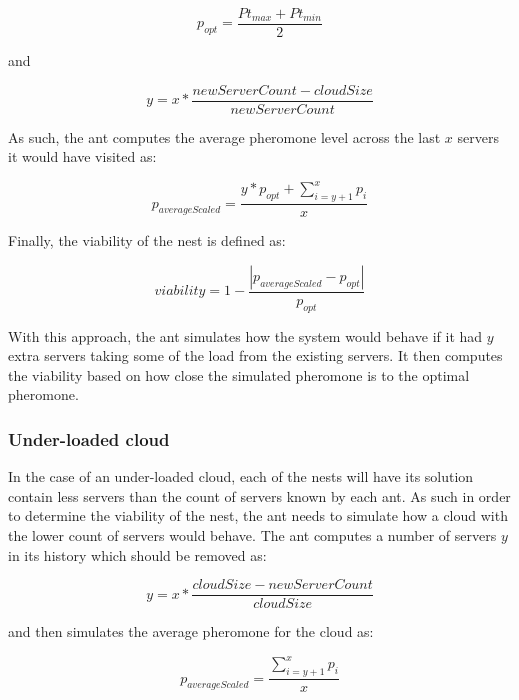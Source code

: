 \begin{equation}
	p_{opt} = \frac{Pt_{max} + Pt_{min}}{2}
\end{equation}

and 

\begin{equation}
	y = x * \frac{newServerCount - cloudSize}{newServerCount}
\end{equation}

As such, the ant computes the average pheromone level across the last $x$ servers it would have visited as:

\begin{equation}
	p_{averageScaled} = \frac{y * p_{opt} + \sum\limits_{i=y+1}^x p_{i}}{x}
\end{equation}

Finally, the viability of the nest is defined as:

\begin{equation}
	viability = 1 - \frac{\left|p_{averageScaled} - p_{opt}\right|}{p_{opt}}
\end{equation}

With this approach, the ant simulates how the system would behave if it had $y$ extra servers taking some of the load from the existing servers. It then computes the viability based on how close the simulated pheromone is to the optimal pheromone.

\subsubsection{Under-loaded cloud}

In the case of an under-loaded cloud, each of the nests will have its solution contain less servers than the count of servers known by each ant. As such in order to determine the viability of the nest, the ant needs to simulate how a cloud with the lower count of servers would behave. The ant computes a number of servers $y$ in its history which should be removed as:

\begin{equation}
	y = x * \frac{cloudSize - newServerCount}{cloudSize}
\end{equation}

and then simulates the average pheromone for the cloud as:

\begin{equation}
	p_{averageScaled} = \frac{\sum\limits_{i=y+1}^x p_{i}}{x}
\end{equation}

